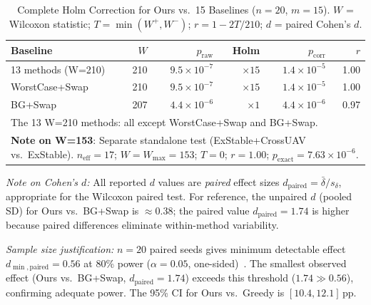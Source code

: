 \documentclass[journal]{IEEEtran}
\begin{document}
\begin{table}[t]
\centering
\caption{Complete Holm Correction for Ours vs.\ 15 Baselines ($n\!=\!20$, $m\!=\!15$). $W$ = Wilcoxon statistic; $T\!=\!\min(W^+,W^-)$; $r = 1\!-\!2T/210$; $d$ = paired Cohen's $d$.}
\label{tab:holm}
\scriptsize
\begin{tabular}{lrrrrr}
\toprule
\textbf{Baseline} & $W$ & $p_{\text{raw}}$ & Holm & $p_{\text{corr}}$ & $r$ \\
\midrule
13 methods (W=210) & 210 & $9.5\!\times\!10^{-7}$ & $\times 15$ & $1.4\!\times\!10^{-5}$ & 1.00 \\
WorstCase+Swap & 210 & $9.5\!\times\!10^{-7}$ & $\times 15$ & $1.4\!\times\!10^{-5}$ & 1.00 \\
BG+Swap & 207 & $4.4\!\times\!10^{-6}$ & $\times 1$ & $4.4\!\times\!10^{-6}$ & 0.97 \\
\bottomrule
\multicolumn{6}{l}{\scriptsize The 13 W=210 methods: all except WorstCase+Swap and BG+Swap.} \\
\multicolumn{6}{p{0.85\columnwidth}}{\scriptsize \textbf{Note on W=153}: Separate standalone test (ExStable+CrossUAV vs.\ ExStable). $n_{\text{eff}}\!=\!17$; $W\!=\!W_{\max}\!=\!153$; $T\!=\!0$; $r\!=\!1.00$; $p_{\text{exact}}\!=\!7.63\!\times\!10^{-6}$.} \\
\end{tabular}
\end{table}

\emph{Note on Cohen's $d$:}
All reported $d$ values are \emph{paired} effect sizes $d_{\text{paired}} = \bar{\delta} / s_\delta$, appropriate for the Wilcoxon paired test.
For reference, the unpaired $d$ (pooled SD) for Ours vs.\ BG+Swap is $\approx 0.38$; the paired value $d_{\text{paired}} = 1.74$ is higher because paired differences eliminate within-method variability.

\emph{Sample size justification:} $n\!=\!20$ paired seeds gives minimum detectable effect $d_{\min,\text{paired}}\!=\!0.56$ at 80\% power ($\alpha\!=\!0.05$, one-sided)~\cite{kerby2014simple}.
The smallest observed effect (Ours vs.\ BG+Swap, $d_{\text{paired}}\!=\!1.74$) exceeds this threshold ($1.74 \gg 0.56$), confirming adequate power.
The 95\% CI for Ours vs.\ Greedy is $[10.4, 12.1]$\,pp.
\end{document}
